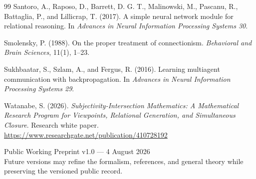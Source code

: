 \documentclass[11pt,a4paper]{article}
\begin{document}
\begin{thebibliography}{99}
Santoro, A., Raposo, D., Barrett, D. G. T., Malinowski, M., Pascanu, R., Battaglia, P., and Lillicrap, T. (2017). A simple neural network module for relational reasoning. In \emph{Advances in Neural Information Processing Systems 30}.

Smolensky, P. (1988). On the proper treatment of connectionism. \emph{Behavioral and Brain Sciences}, 11(1), 1--23.

Sukhbaatar, S., Szlam, A., and Fergus, R. (2016). Learning multiagent communication with backpropagation. In \emph{Advances in Neural Information Processing Systems 29}.

Watanabe, S. (2026). \emph{Subjectivity-Intersection Mathematics: A Mathematical Research Program for Viewpoints, Relational Generation, and Simultaneous Closure}. Research white paper. \url{https://www.researchgate.net/publication/410728192}

\end{thebibliography}

\vfill
\begin{center}
\small\sffamily
Public Working Preprint v1.0 --- 4 August 2026\\
Future versions may refine the formalism, references, and general theory while preserving the versioned public record.
\end{center}
\end{document}

